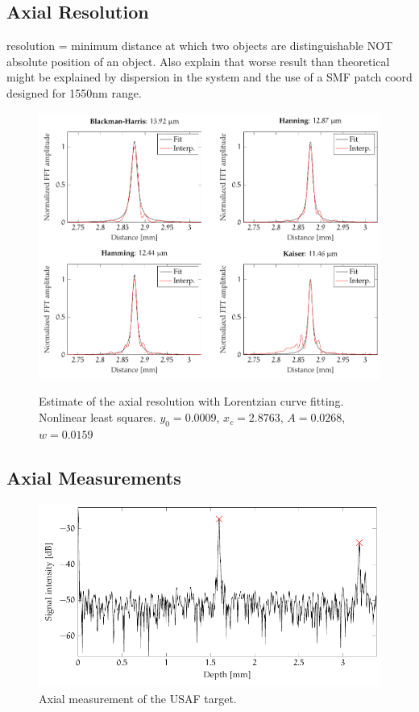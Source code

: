
\subsection{Axial Resolution}
resolution = minimum distance at which two objects are distinguishable NOT absolute position of an object. Also explain that worse result than theoretical might be explained by dispersion in the system and the use of a SMF patch coord designed for 1550nm range.

\begin{figure}[hbt]
{\myfloatalign
\includegraphics[width=\linewidth]{gfx/tikz/axial_resolution}}
\caption{Estimate of the axial resolution with Lorentzian curve fitting. Nonlinear least squares. $y_0 = 0.0009$, $x_c=2.8763$, $A=0.0268$, $w=0.0159$}\label{fig:axial-resolution}
\end{figure}

\subsection{Axial Measurements}

\begin{figure}[hbt]
\myfloatalign
\includegraphics[width=\linewidth]{gfx/tikz/thickness-measure/target-thickness}
\caption{Axial measurement of the USAF target.}\label{fig:target-thickness}
\end{figure}

